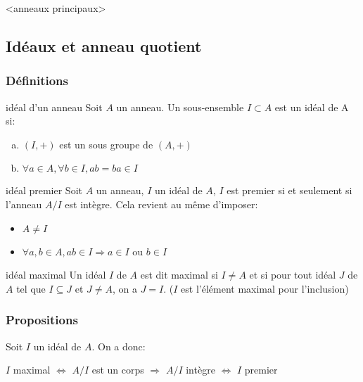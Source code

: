 <anneaux principaux>


\subsection{Idéaux et anneau quotient}

\subsubsection{Définitions}

\begin{definition}{idéal d'un anneau}{}
    Soit $A$ un anneau. Un sous-ensemble $I \subset A$ est un idéal de A si:
    \begin{enumerate}[(a)]
        \item $(I, +)$ est un sous groupe de $(A, +)$
        \item $\forall a \in A, \forall b \in I, ab = ba \in I$
    \end{enumerate}
\end{definition}

\begin{definition}{idéal premier}{}
    Soit $A$ un anneau, $I$ un idéal de $A$, $I$ est premier si et seulement si l'anneau $A/I$ est intègre.
    Cela revient au même d'imposer:
    \begin{itemize}
        \item $A \neq I$
        \item $\forall a, b \in A, ab \in I \Longrightarrow a \in I$ ou $ b \in I$
    \end{itemize}
\end{definition}

\begin{definition}{idéal maximal}{}
    Un idéal $I$ de $A$ est dit maximal si $I \neq A$ et si pour tout idéal $J$ de $A$ tel que $I \subseteq J$ et $J \neq A$, on a $J = I$.
    ($I$ est l'élément maximal pour l'inclusion)
\end{definition}



\subsubsection{Propositions}

\begin{proposition}{}{}
    Soit $I$ un idéal de $A$. On a donc:
    \begin{center}
        $I$ maximal $\Longleftrightarrow$ $A/I$ est un corps $\Longrightarrow$ $A/I$ intègre $\Longleftrightarrow$ $I$ premier
    \end{center}
\end{proposition}

